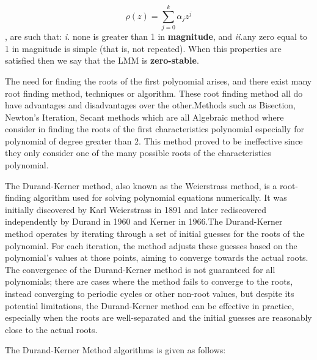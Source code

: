 \begin{equation}
    \rho(z) = \sum_{j=0}^{k}\alpha_jz^{j}
\end{equation}
, are such that: \textit{i.} none is greater than 1 in \textbf{magnitude}, and \textit{ii.}any zero equal to 1 in magnitude is simple (that is, not repeated). When this properties are satisfied then we say that the LMM is \textbf{zero-stable}.

The need for finding the roots of the first polynomial arises, and there exist many root finding method, techniques or algorithm. These root finding method all do have advantages and disadvantages over the other.Methods such as Bisection, Newton's Iteration, Secant methods which are all Algebraic method where consider in finding the roots of the first characteristics polynomial especially for polynomial of degree greater than $2$. This method proved to be ineffective since they only consider one of the many possible roots of the characteristics polynomial.

The Durand-Kerner method, also known as the Weierstrass method, is a root-finding algorithm used for solving polynomial equations numerically. It was initially discovered by Karl Weierstrass in 1891 and later rediscovered independently by Durand in 1960 and Kerner in 1966.The Durand-Kerner method operates by iterating through a set of initial guesses for the roots of the polynomial. For each iteration, the method adjusts these guesses based on the polynomial's values at those points, aiming to converge towards the actual roots. The convergence of the Durand-Kerner method is not guaranteed for all polynomials; there are cases where the method fails to converge to the roots, instead converging to periodic cycles or other non-root values, but despite its potential limitations, the Durand-Kerner method can be effective in practice, especially when the roots are well-separated and the initial guesses are reasonably close to the actual roots.

The Durand-Kerner Method algorithms is given as follows:

